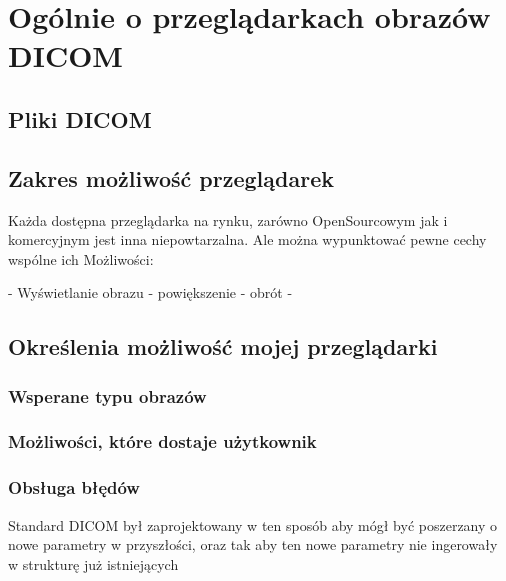 
\section{Ogólnie o przeglądarkach obrazów DICOM}

\subsection{Pliki DICOM}

\subsection{Zakres możliwość przeglądarek}

Każda dostępna przeglądarka na rynku, zarówno OpenSourcowym jak i komercyjnym jest inna niepowtarzalna. Ale można wypunktować pewne cechy wspólne ich Możliwości:

 - Wyświetlanie obrazu
  - powiększenie 
  - obrót
  - 

\subsection{Określenia możliwość mojej przeglądarki}

\subsubsection{Wsperane typu obrazów}

\subsubsection{Możliwości, które dostaje użytkownik}

\subsubsection{Obsługa błędów}

Standard DICOM był zaprojektowany w ten sposób aby mógł być poszerzany o nowe parametry w przyszłości, oraz tak aby ten nowe parametry nie ingerowały w strukturę już istniejących

